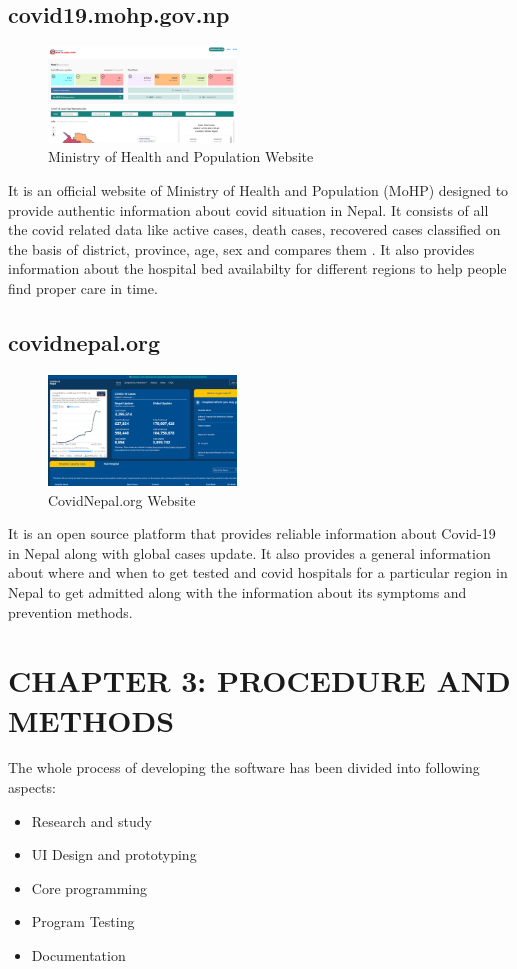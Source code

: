 \documentclass{article}
\begin{document}
\subsection{covid19.mohp.gov.np}
\begin{figure}[h]
    \centerline{\includegraphics[width = 50mm]{mohp.png}}
    \caption{Ministry of Health and Population Website}
    \label{fig}
\end{figure}
It is an official website of Ministry of Health and Population (MoHP) designed to provide authentic information about covid situation in Nepal. It consists of all the covid related data like active cases, death cases, recovered cases classified on the basis of district, province, age, sex and compares them . It also provides information about the hospital bed availabilty for different regions to help people find proper care in time. 

\clearpage
\subsection{covidnepal.org}
\begin{figure}[h]
    \centerline{\includegraphics[width = 50mm]{covidnepal.png}}
    \caption{CovidNepal.org Website}
    \label{fig}
\end{figure}
It is an open source platform that provides reliable information about Covid-19 in Nepal along with global cases update. It also provides a general information about where and when to get tested and covid hospitals for a particular region in Nepal to get admitted along with the information about its symptoms and prevention methods. 
\clearpage

\section{CHAPTER 3: PROCEDURE AND METHODS}
The whole process of developing the software has been divided into following aspects:
\begin{itemize}
    \item Research and study
    \item UI Design and prototyping
    \item Core programming
    \item Program Testing
    \item Documentation
\end{itemize}
\end{document}
